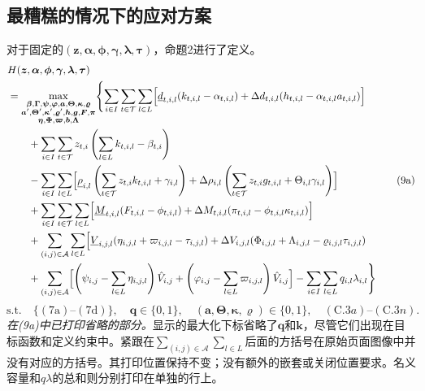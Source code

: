 \documentclass{article}
\begin{document}
\subsection*{最糟糕的情况下的应对方案}
对于固定的$(\boldsymbol z,\boldsymbol\alpha,\boldsymbol\phi,
\boldsymbol\gamma,\boldsymbol\lambda,\boldsymbol\tau)$，命题2进行了定义。
\begin{equation}
\begin{aligned}
&H(\boldsymbol z,\boldsymbol\alpha,\boldsymbol\phi,
\boldsymbol\gamma,\boldsymbol\lambda,\boldsymbol\tau)\\
&=\max_{\substack{
\boldsymbol\beta,\boldsymbol\Gamma,\boldsymbol\psi,\boldsymbol\varphi,
\boldsymbol a,\boldsymbol\Theta,\boldsymbol\kappa,\boldsymbol\varrho\\
\boldsymbol a',\boldsymbol\Theta',\boldsymbol\kappa',\boldsymbol\varrho',
\boldsymbol h,\boldsymbol g,\boldsymbol F,\boldsymbol\pi\\
\boldsymbol\eta,\boldsymbol\Phi,\boldsymbol\varpi,\boldsymbol b,\boldsymbol\Lambda}}
\Biggl\{\sum_{i\in I}\sum_{t\in\mathcal T}\sum_{l\in L}
\Bigl[\underline d_{t,i,l}(k_{t,i,l}-\alpha_{t,i,l})
+\Delta d_{t,i,l}(h_{t,i,l}-\alpha_{t,i,l}a_{t,i,l})\Bigr]\\
&\qquad+\sum_{i\in I}\sum_{t\in\mathcal T}z_{t,i}
\left(\sum_{l\in L}k_{t,i,l}-\beta_{t,i}\right)\\
&\qquad-\sum_{i\in I}\sum_{l\in L}
\Bigl[\underline\rho_{i,l}\left(\sum_{t\in\mathcal T}z_{t,i}k_{t,i,l}+\gamma_{i,l}\right)
+\Delta\rho_{i,l}\left(\sum_{t\in\mathcal T}z_{t,i}g_{t,i,l}+\Theta_{i,l}\gamma_{i,l}\right)\Bigr]\\
&\qquad+\sum_{i\in I}\sum_{t\in\mathcal T}\sum_{l\in L}
\Bigl[\underline M_{t,i,l}(F_{t,i,l}-\phi_{t,i,l})
+\Delta M_{t,i,l}(\pi_{t,i,l}-\phi_{t,i,l}\kappa_{t,i,l})\Bigr]\\
&\qquad+\sum_{(i,j)\in\mathcal A}\sum_{l\in L}
\Bigl[\underline V_{i,j,l}(\eta_{i,j,l}+\varpi_{i,j,l}-\tau_{i,j,l})
+\Delta V_{i,j,l}(\Phi_{i,j,l}+\Lambda_{i,j,l}-\varrho_{i,j,l}\tau_{i,j,l})\\
&\qquad+\sum_{(i,j)\in\mathcal A}
\Bigl[\left(\psi_{i,j}-\sum_{l\in L}\eta_{i,j,l}\right)\hat V_{i,j}
+\left(\varphi_{i,j}-\sum_{l\in L}\varpi_{i,j,l}\right)\hat V_{i,j}\Bigr]
-\sum_{i\in I}\sum_{l\in L}q_{i,l}\lambda_{i,l}\Biggr\}
\end{aligned}\tag{9a}
\end{equation}
\begin{equation}
\text{s.t.}\quad
\{(7\mathrm a)\text{--}(7\mathrm d)\},\quad
\boldsymbol q\in\{0,1\},\quad
(\boldsymbol a,\boldsymbol\Theta,\boldsymbol\kappa,\boldsymbol\varrho)\in\{0,1\},
\quad (\mathrm C.3a)\text{--}(\mathrm C.3n).\tag{9b}
\end{equation}
\noindent\emph{在(9a)中已打印省略的部分。}显示的最大化下标省略了$\boldsymbol q$和$\boldsymbol k$，尽管它们出现在目标函数和定义约束中。紧跟在$\sum_{(i,j)\in\mathcal A}\sum_{l\in L}$后面的方括号在原始页面图像中并没有对应的方括号。其打印位置保持不变；没有额外的嵌套或关闭位置要求。名义容量和$q\lambda$的总和则分别打印在单独的行上。
\end{document}
